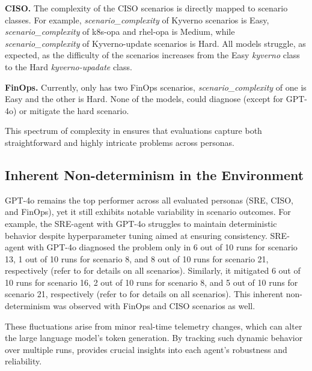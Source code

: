 \textbf{CISO.}
The complexity of the CISO scenarios is directly mapped to scenario classes. For example, \textit{scenario\_complexity} of Kyverno scenarios is Easy, \textit{scenario\_complexity} of k8s-opa and rhel-opa is Medium, while \textit{scenario\_complexity} of Kyverno-update scenarios is Hard. 
All models struggle, as expected, as the difficulty of the scenarios increases from the Easy \textit{kyverno} class to the Hard \textit{kyverno-upadate} class. 

\textbf{FinOps.}
Currently, \bench only has two FinOps scenarios, \textit{scenario\_complexity} of one is Easy and the other is Hard. None of the models, could diagnose (except for GPT-4o) or mitigate the hard scenario. 

This spectrum of complexity in \bench ensures that evaluations capture both straightforward and highly intricate problems across personas.

\subsection{Inherent Non-determinism in the Environment} 
GPT-4o remains the top performer across all evaluated personas (SRE, CISO, and FinOps), yet it still exhibits notable variability in scenario outcomes. 
For example, the SRE-agent with GPT-4o struggles to maintain deterministic behavior despite hyperparameter tuning aimed at ensuring consistency. 
SRE-agent with GPT-4o diagnosed the problem only in 6 out of 10 runs for scenario 13, 1 out of 10 runs for scenario 8, and 8 out of 10 runs for scenario 21, respectively (refer to  for details on all scenarios).
Similarly, it mitigated 6 out of 10 runs for scenario 16, 2 out of 10 runs for scenario 8, and 5 out of 10 runs for scenario 21, respectively (refer to  for details on all scenarios).
This inherent non-determinism was observed with FinOps and CISO scenarios as well. 

These fluctuations arise from minor real-time telemetry changes, which can alter the large language model’s token generation. By tracking such dynamic behavior over multiple runs, \bench provides crucial insights into each agent’s robustness and reliability.




